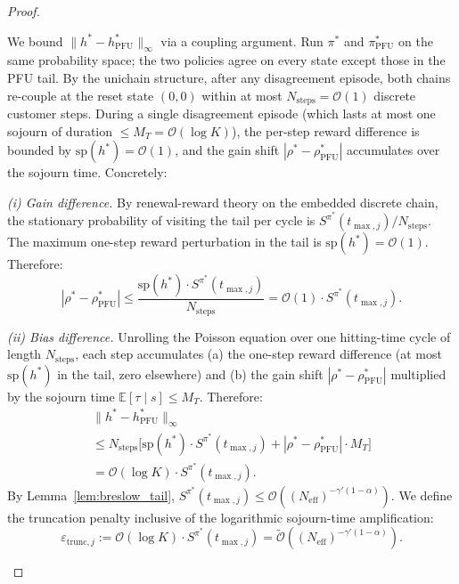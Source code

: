 \documentclass[letterpaper, 10 pt, conference]{IEEEconf}
\newcommand{\E}{\mathbb{E}}
\begin{document}
\begin{proof}
\begin{itemize}
        We bound $\|h^* - h^*_{\mathrm{PFU}}\|_\infty$ via a coupling argument. Run $\pi^*$ and $\pi^*_{\mathrm{PFU}}$ on the same probability space; the two policies agree on every state except those in the PFU tail. By the unichain structure, after any disagreement episode, both chains re-couple at the reset state $(0,0)$ within at most $N_{\mathrm{steps}} = \mathcal{O}(1)$ discrete customer steps. During a single disagreement episode (which lasts at most one sojourn of duration $\le M_T = \mathcal{O}(\log K)$), the per-step reward difference is bounded by $\mathrm{sp}(h^*) = \mathcal{O}(1)$, and the gain shift $|\rho^* - \rho^*_{\mathrm{PFU}}|$ accumulates over the sojourn time. Concretely:

        \noindent\emph{(i) Gain difference.} By renewal-reward theory on the embedded discrete chain, the stationary probability of visiting the tail per cycle is $S^{\pi^*}(t_{\max,j}) / N_{\mathrm{steps}}$. The maximum one-step reward perturbation in the tail is $\mathrm{sp}(h^*) = \mathcal{O}(1)$. Therefore:
        \begin{equation}
            |\rho^* - \rho^*_{\mathrm{PFU}}| \leq \frac{\mathrm{sp}(h^*) \cdot S^{\pi^*}(t_{\max,j})}{N_{\mathrm{steps}}} = \mathcal{O}(1) \cdot S^{\pi^*}(t_{\max,j}).
        \end{equation}

        \noindent\emph{(ii) Bias difference.} Unrolling the Poisson equation over one hitting-time cycle of length $N_{\mathrm{steps}}$, each step accumulates (a) the one-step reward difference (at most $\mathrm{sp}(h^*)$ in the tail, zero elsewhere) and (b) the gain shift $|\rho^* - \rho^*_{\mathrm{PFU}}|$ multiplied by the sojourn time $\E[\tau \mid s] \le M_T$. Therefore:
        \begin{multline}
            \label{eq:trunc_bias}
            \|h^* - h^*_{\mathrm{PFU}}\|_\infty \\
            \leq N_{\mathrm{steps}} \Big[\mathrm{sp}(h^*) \cdot S^{\pi^*}(t_{\max,j}) + |\rho^* - \rho^*_{\mathrm{PFU}}| \cdot M_T\Big] \\
            = \mathcal{O}(\log K) \cdot S^{\pi^*}(t_{\max,j}).
        \end{multline}
        By Lemma~\ref{lem:breslow_tail}, $S^{\pi^*}(t_{\max,j}) \le \mathcal{O}((N_{\mathrm{eff}})^{-\gamma'(1-\alpha)})$. We define the truncation penalty inclusive of the logarithmic sojourn-time amplification:
        \begin{equation}
            \label{eq:trunc_penalty_def}
            \varepsilon_{\mathrm{trunc},j} := \mathcal{O}(\log K) \cdot S^{\pi^*}(t_{\max,j}) = \widetilde{\mathcal{O}}((N_{\mathrm{eff}})^{-\gamma'(1-\alpha)}).
        \end{equation}


\end{itemize}
\end{proof}
\end{document}
